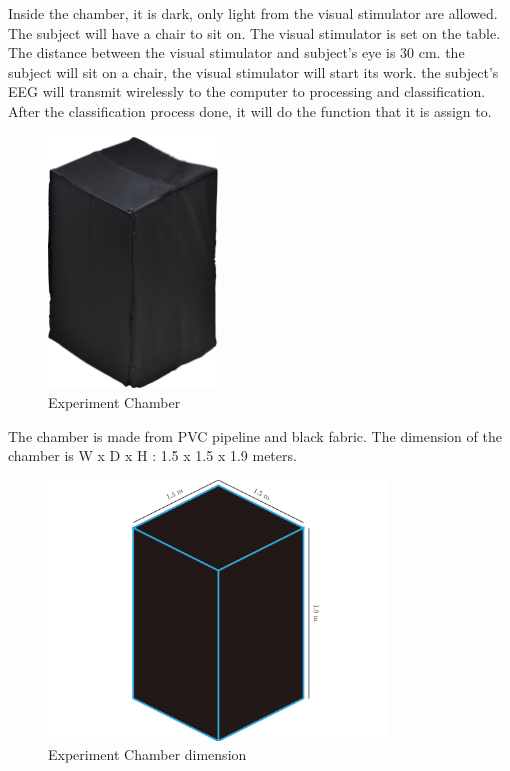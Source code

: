 Inside the chamber, it is dark, only light from the visual stimulator are allowed. The subject will have a chair to sit on. The visual stimulator is set on the table. The distance between the visual stimulator and subject's eye is 30 cm. the subject will sit on a chair, the visual stimulator will start its work. the subject's EEG will transmit wirelessly to the computer to processing and classification. After the classification process done, it will do the function that it is assign to. \\
\begin{figure}[ht]
	\centering
	\includegraphics[width=0.4\textwidth]{chapter6/blackbox.jpg}
	\caption{Experiment Chamber}
\end{figure}
The chamber is made from PVC pipeline and black fabric. The dimension of the chamber is W x D x H : 1.5 x 1.5 x 1.9 meters.\\
\begin{figure}[ht]
	\centering
	\includegraphics[width=0.8\textwidth]{chapter6/dark_wire.pdf}
	\caption{Experiment Chamber dimension}
\end{figure}
